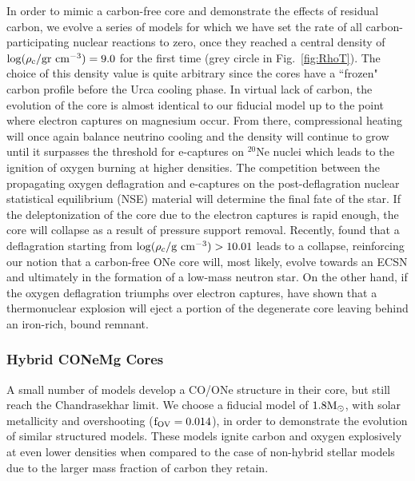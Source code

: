 \documentclass[../../main/thesis_msc.tex]{subfiles}
\begin{document}
        In order to mimic a carbon-free core and demonstrate the effects of residual carbon, we evolve a series of models for which we have set the rate of all carbon-participating nuclear reactions to zero, once they reached a central density of $\rm \log(\rho_c / \rm gr \ cm^{-3}) = 9.0$ for the first time (grey circle in Fig.\, \ref{fig:RhoT}). The choice of this density value is quite arbitrary since the cores have a ``frozen" carbon profile before the Urca cooling phase. In virtual lack of carbon, the evolution of the core is almost identical to our fiducial model up to the point where electron captures on magnesium occur. From there, compressional heating will once again balance neutrino cooling and the density will continue to grow until it surpasses the threshold for e-captures on $^{20}$Ne nuclei which leads to the ignition of oxygen burning at higher densities. The competition between the propagating oxygen deflagration and e-captures on the post-deflagration nuclear statistical equilibrium (NSE) material will determine the final fate of the star. If the deleptonization of the core due to the electron captures is rapid enough, the core will collapse as a result of pressure support removal. Recently, \cite{Zha2019} found that a deflagration starting from $\log(\rho_c / \rm g \ cm^{-3}) > 10.01$ leads to a collapse, reinforcing our notion that a carbon-free ONe core will, most likely, evolve towards an ECSN and ultimately in the formation of a low-mass neutron star. On the other hand, if the oxygen deflagration triumphs over electron captures, \cite{Jones2016} have shown that a thermonuclear explosion will eject a portion of the degenerate core leaving behind an iron-rich, bound remnant.
        
        
        \subsubsection{Hybrid CONeMg Cores}
    
        A small number of models develop a CO/ONe structure in their core, but still reach the Chandrasekhar limit. We choose a fiducial model of $1.8 \rm M_{\odot}$, with solar metallicity and overshooting ($\rm f_{\rm OV} = 0.014$), in order to demonstrate the evolution of similar structured models. 
        These models ignite carbon and oxygen explosively at even lower densities when compared to the case of non-hybrid stellar models due to the larger mass fraction of carbon they retain.
        
\end{document}
